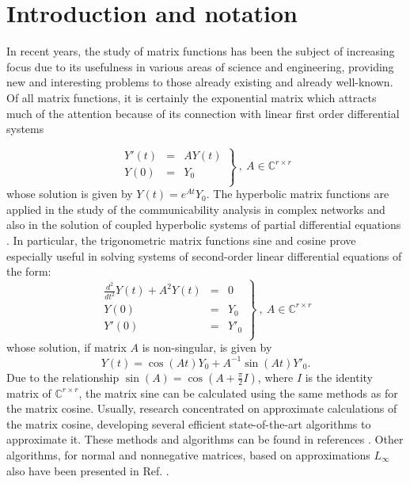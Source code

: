 \section{Introduction and notation}
In recent years, the study of matrix functions has been the subject of increasing focus due to its usefulness in various areas of
science and engineering, providing new and interesting problems to those already existing and already well-known. Of all matrix functions,
it is certainly the exponential matrix which attracts much of the attention because of its connection with linear first
order differential systems

$$
\left.
\begin{array}{rcl}
Y'(t)&=& AY(t) \\
Y(0)&=& Y_{0} \\
\end{array}\right\} \ , \ A \in \mathbb{C}^{r \times r}
$$
whose solution is given by $Y(t)=e^{A t} Y_{0}$. The hyperbolic matrix functions are applied in the study of the communicability analysis in complex
networks \cite{estrada2008communicability,estrada2005spectral,estrada2016network} and also in the solution of coupled hyperbolic systems
of partial differential equations \cite{jodar2003constructive}. In particular, the trigonometric matrix functions sine and cosine prove especially useful
 in solving systems of second-order linear differential equations of the form:
$$
\left.
\begin{array}{rcl}
\displaystyle \frac{d^2}{dt^2}Y(t)+A^2 Y(t)&=&0 \\
Y(0)&=& Y_{0} \\
Y'(0)&=& Y'_{0} \\
\end{array}\right\} \ , \ A \in \mathbb{C}^{r \times r}
$$
whose solution, if matrix $A$ is non-singular, is given by
$$
Y(t)=\cos{(At)} Y_0+ A^{-1}\sin{(At)}Y'_0.
$$
Due to the relationship $\displaystyle \sin{(A)}=\cos{\left(A + \frac{\pi}{2} I \right)}$, where $I$ is the identity matrix of $\mathbb{C}^{r \times r}$, the
matrix sine can be calculated using the same methods as for the matrix cosine. Usually, research concentrated on approximate calculations of the matrix cosine, 
developing several efficient state-of-the-art algorithms to approximate it. These
methods and algorithms can be found in references \cite{Serb80, dehghan2010computing, High08, alonso2018computing}. Other algorithms, for normal and
nonnegative matrices, based on approximations $L_{\infty}$ also have been presented in Ref. \cite{tsitouras2014bounds}. \\

